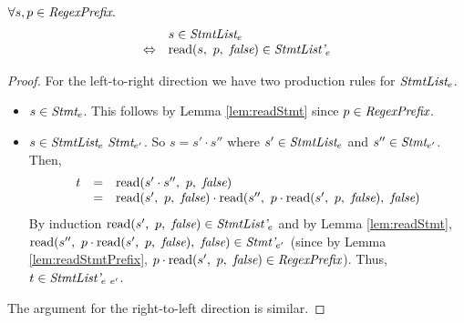 \documentclass[preprint,10pt]{sigplanconf}
\begin{document}
\begin{lemma}\mbox{}

  \( \forall s, p \in \textit{RegexPrefix}. \)
  \[
  \begin{array}{rl}
  &s \in \textit{StmtList}_{e} 
  \\
  \Leftrightarrow &
  \textrm{read}(s,~p,~\textit{false}) \in \textit{StmtList'}_{e}
  \end{array}
  \]
\end{lemma}
\begin{proof}
  For the left-to-right direction we have two production rules for
  \( \textit{StmtList}_{e} \).
  \begin{itemize}
  \item \( s \in \textit{Stmt}_{e} \).
    This follows by Lemma \ref{lem:readStmt} since \( p \in \textit{RegexPrefix} \).

  \item \( s \in \textit{StmtList}_{e}~ \textit{Stmt}_{e'} \). So \( s =
    s' \cdot s'' \) where \( s' \in \textit{StmtList}_{e} \) and \( s''
    \in \textit{Stmt}_{e'} \). Then,
    \[
    \begin{array}{rcl}
      t &=& \textrm{read}(s' \cdot s'',~p,~\textit{false})
      \\
      &=& \textrm{read}(s',~p,~\textit{false}) \cdot \textrm{read}(s'',~p 
        \cdot \textrm{read}(s',~p,~\textit{false}),~\textit{false})
    \end{array}
    \]
    By induction \( \textrm{read}(s',~p,~\textit{false}) \in \textit{StmtList'}_{e} \)
    and by Lemma \ref{lem:readStmt}, \( \textrm{read}(s'',~p \cdot
      \textrm{read}(s',~p,~\textit{false}),~\textit{false}) \in \textit{Stmt'}_{e'} \) (since
    by Lemma \ref{lem:readStmtPrefix}, \( p \cdot
    \textrm{read}(s',~p,~\textit{false}) \in \textit{RegexPrefix} \)). Thus, \( t \in
    \textit{StmtList'}_{e~e'} \).
  \end{itemize}
  
  The argument for the right-to-left direction is similar.
\end{proof}
\end{document}
